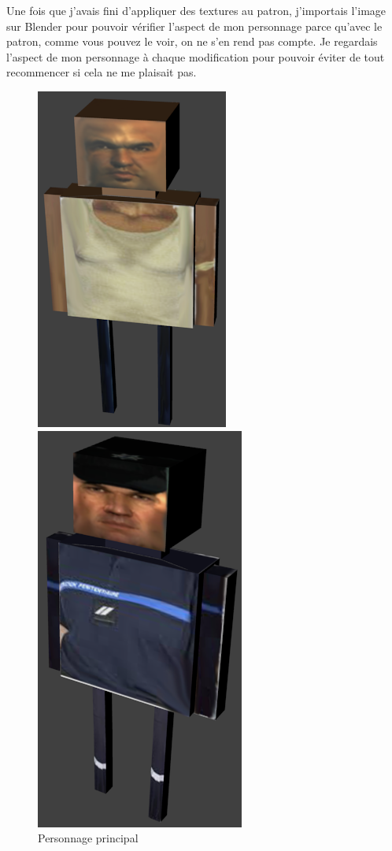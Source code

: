 \documentclass[12pt]{article}
\begin{document}
\par
Une fois que j'avais fini d'appliquer des textures au patron, j'importais l'image sur Blender pour pouvoir vérifier l'aspect de mon personnage parce qu'avec le patron, comme vous pouvez le voir, on ne s'en rend pas compte. Je regardais l'aspect de mon personnage à chaque modification pour pouvoir éviter de tout recommencer si cela ne me plaisait pas.
\newline

\begin{figure}[htbp]
\begin{minipage}[c]{.45\linewidth}
\begin{center}
\includegraphics[scale=0.6]{michael.png}
\caption{Personnage principal}
\label{fig:michael}
\end{center}
\end{minipage}
\hfill
\begin{minipage}[c]{.45\linewidth}
\begin{center}
\includegraphics[scale=0.5]{bellik.png}

\end{center}
\end{minipage}
\end{figure}
\end{document}
